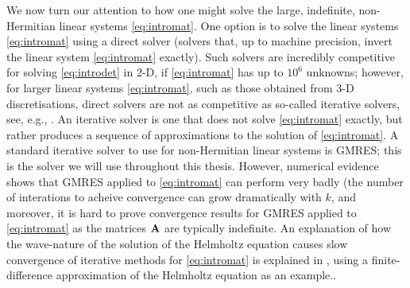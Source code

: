 We now turn our attention to how one might solve the large, indefinite, non-Hermitian linear systems \eqref{eq:intromat}. One option is to solve the linear systems \eqref{eq:intromat} using a direct solver (solvers that, up to machine precision, invert the linear system \eqref{eq:intromat} exactly). Such solvers are incredibly competitive for solving \eqref{eq:introdet} in 2-D, if \eqref{eq:intromat} has up to $10^6$ unknowns; however, for larger linear systems \eqref{eq:intromat}, such as those obtained from 3-D discretisations, direct solvers are not as competitive as so-called iterative solvers, see, e.g., \cite[p. 70]{ElSiWa:14}. An iterative solver is one that does not solve \eqref{eq:intromat} exactly, but rather produces a sequence of approximations to the solution of \eqref{eq:intromat}. A standard iterative solver to use for non-Hermitian linear systems is GMRES; this is the solver we will use throughout this thesis. However, numerical evidence shows that GMRES applied to \eqref{eq:intromat} can perform very badly (the number of interations to acheive convergence can grow dramatically with $k$, and moreover, it is hard to prove convergence results for GMRES applied to \eqref{eq:intromat} as the matrices $\mathbf{A}$ are typically indefinite. An explanation of how the wave-nature of the solution of the Helmholtz equation causes slow convergence of iterative methods for \eqref{eq:intromat} is explained in \cite[Section 2.1]{ErGa:12}, using a finite-difference approximation of the Helmholtz equation as an example..

